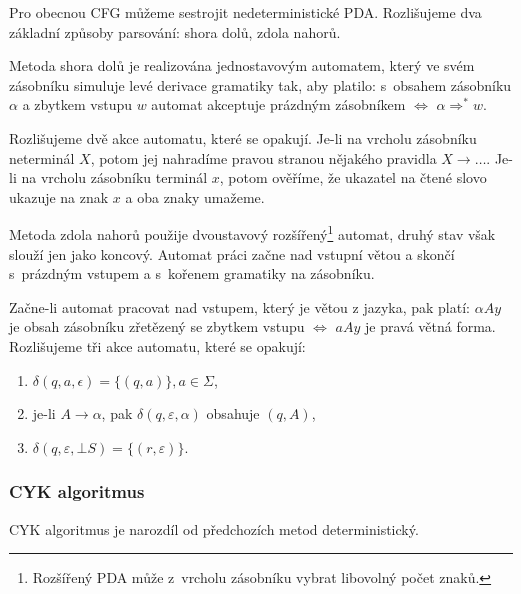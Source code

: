 Pro obecnou CFG můžeme sestrojit nedeterministické PDA. Rozlišujeme dva
základní způsoby parsování: shora dolů, zdola nahorů.

Metoda shora dolů je realizována jednostavovým automatem, který ve svém
zásobníku simuluje levé derivace gramatiky tak, aby platilo:
s~obsahem zásobníku $\alpha$ a zbytkem vstupu $w$ automat akceptuje
prázdným zásobníkem $\iff$ $\alpha \Rightarrow^* w$.

Rozlišujeme dvě akce automatu, které se opakují.
Je-li na vrcholu zásobníku neterminál
$X$, potom jej nahradíme pravou stranou nějakého pravidla $X \to
\ldots$. Je-li na vrcholu zásobníku terminál $x$, potom ověříme,
že ukazatel na čtené slovo ukazuje na znak $x$ a oba znaky umažeme.

\begin{example}

\end{example}

Metoda zdola nahorů použije dvoustavový rozšířený\footnote{Rozšířený
PDA může z~vrcholu zásobníku vybrat libovolný počet znaků.} automat, druhý
stav však slouží jen jako koncový. Automat práci začne
nad vstupní větou a skončí s~prázdným vstupem a s~kořenem gramatiky na
zásobníku.

Začne-li automat pracovat nad vstupem, který je větou z jazyka, pak
platí: $\alpha A y$ je obsah zásobníku zřetězený se zbytkem vstupu
$\iff$ $a A y$ je pravá větná forma. Rozlišujeme tři akce automatu,
které se opakují:
\begin{enumerate}
    \item $\delta(q, a, \epsilon) = \{ (q, a) \}, a \in \Sigma$,
    \item je-li $A \to \alpha$, pak $\delta(q, \varepsilon, \alpha)$
        obsahuje $(q, A)$,
    \item $\delta(q, \varepsilon, \bot S) = \{ (r, \varepsilon) \}$.
\end{enumerate}

\begin{example}
\end{example}


\subsubsection{CYK algoritmus}

CYK algoritmus je narozdíl od předchozích metod deterministický.


